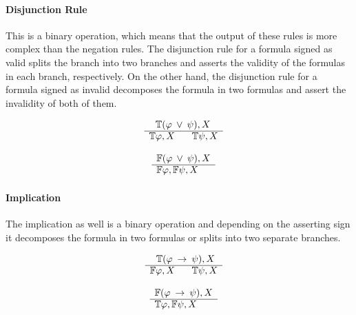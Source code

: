 \documentclass{article}
\newcommand{\signT}{\mathbb{T}}
\newcommand{\signF}{\mathbb{F}}
\begin{document}
		\paragraph{Disjunction Rule}
This is a binary operation, which means that the output of these rules is more complex than the negation rules.
The disjunction rule for a formula signed as valid splits the branch into two branches and asserts the validity of the formulas in each branch, respectively.
On the other hand, the disjunction rule for a formula signed as invalid decomposes the formula in two formulas and assert the invalidity of both of them.
		\newline
		\noindent\begin{minipage}{.5\linewidth}
		\begin{align*}
			\begin{array}{rl}
				& \:\:\: \signT(\varphi \: \vee \: \psi), X \\
			      \cline{2-2}
			      & \signT\varphi, X \:\:\:\:\:\:\:\: \signT\psi, X
			\end{array}
		\end{align*}
		\end{minipage}%
		\begin{minipage}{.5\linewidth}
		\begin{align*}
			\begin{array}{rl}
				& \signF(\varphi \: \vee \: \psi), X \\
			      \cline{2-2}
			      & \signF\varphi, \signF\psi, X
			\end{array}
		\end{align*}
		\end{minipage}
		
		\paragraph{Implication}
The implication as well is a binary operation and depending on the asserting sign it decomposes the formula in two formulas or splits into two separate branches.
		\newline
		\noindent\begin{minipage}{.5\linewidth}
		\begin{align*}
			\begin{array}{rl}
				& \:\:\: \signT(\varphi \: \rightarrow \: \psi), X \\
			      \cline{2-2}
			      & \signF\varphi, X \:\:\:\:\:\:\:\: \signT\psi, X
			\end{array}
		\end{align*}
		\end{minipage}%
		\begin{minipage}{.5\linewidth}
		\begin{align*}
			\begin{array}{rl}
				& \signF(\varphi \: \rightarrow \: \psi), X \\
			      \cline{2-2}
			      & \signT\varphi, \signF\psi, X
			\end{array}
		\end{align*}
		\end{minipage}
		
\end{document}
